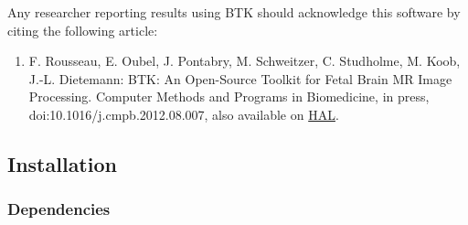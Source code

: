 \documentclass[a4paper,10pt]{article}
\begin{document}
Any researcher reporting results using BTK should acknowledge this software by citing the following article:
\begin{enumerate}
\item F. Rousseau, E. Oubel, J. Pontabry, M. Schweitzer, C. Studholme, M. Koob, J.-L. Dietemann: BTK: An Open-Source Toolkit for Fetal Brain MR Image Processing. Computer Methods and Programs in Biomedicine, in press, doi:10.1016/j.cmpb.2012.08.007, also available on \href{http://hal.archives-ouvertes.fr/index.php?halsid=d0mrvug09qhhou49vgaqc6ogd3&view_this_doc=hal-00671183&version=1}{HAL}.
\end{enumerate}

\subsection{Installation}

\subsubsection{Dependencies}
\end{document}
